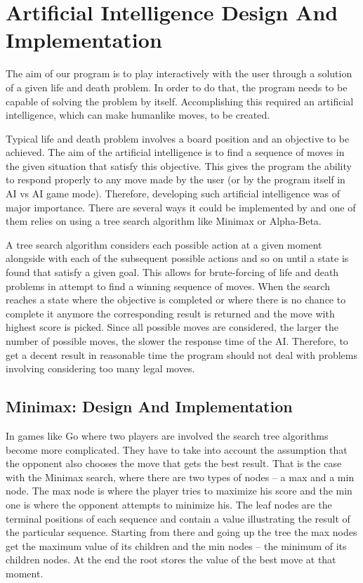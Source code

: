 \documentclass{l3proj}
\begin{document}
\section{Artificial Intelligence Design And Implementation}

The aim of our program is to play interactively with the user through a solution of a given life and death problem. In order to do that, the program needs to be capable of solving the problem by itself. Accomplishing this required an artificial intelligence, which can make humanlike moves, to be created.
 
Typical life and death problem involves a board position and an objective to be achieved. The aim of the artificial intelligence is to find a sequence of moves in the given situation that satisfy this objective. This gives the program the ability to respond properly to any move made by the user (or by the program itself in AI vs AI game mode). Therefore, developing such artificial intelligence was of major importance. There are several ways it could be implemented by and one of them relies on using a tree search algorithm like Minimax or Alpha-Beta.
 
A tree search algorithm considers each possible action at a given moment alongside with each of the subsequent possible actions and so on until a state is found that satisfy a given goal. This allows for brute-forcing of life and death problems in attempt to find a winning sequence of moves. When the search reaches a state where the objective is completed or where there is no chance to complete it anymore the corresponding result is returned and the move with highest score is picked. Since all possible moves are considered, the larger the number of possible moves, the slower the response time of the AI. Therefore, to get a decent result in reasonable time the program should not deal with problems involving considering too many legal moves.

\subsection{Minimax: Design And Implementation}

In games like Go where two players are involved the search tree algorithms become more complicated. They have to take into account the assumption that the opponent also chooses the move that gets the best result. That is the case with the Minimax search, where there are two types of nodes – a max and a min node. The max node is where the player tries to maximize his score and the min one is where the opponent attempts to minimize his. The leaf nodes are the terminal positions of each sequence and contain a value illustrating the result of the particular sequence. Starting from there and going up the tree the max nodes get the maximum value of its children and the min nodes – the minimum of its children nodes. At the end the root stores the value of the best move at that moment.  
\end{document}
